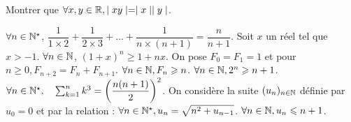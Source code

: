 \begin{exercise}[subtitle= Disjonction des cas]
	\begin{tasks} 
		\task Montrer que $\forall x,y \in \mathbb{R},  \mid xy \mid =\mid x \mid\mid y \mid$.  
	\end{tasks}
\end{exercise}


\begin{exercise}[subtitle= Récurrence]
	\begin{tasks} 
	\task \Mq $\forall n \in \mathbb{N}^\star$, $\dfrac{1}{1\times 2}+\dfrac{1}{2\times 3}+\dots+\dfrac{1}{n\times (n+1)}=\dfrac{n}{n+1}$.
	\task Soit $x$ un réel tel que $x>-1$. \Mq  $\forall n \in \mathbb{N}$, $(1+x)^n\geqslant 1+nx$.
	\task On pose $F_0=F_1= 1$ et pour $n\geqslant 0,F_{n+2}=F_n+F_{n+1}$. \Mq  $ \forall n\in \mathbb{N}, F_n\geqslant n$.
	\task \Mq $\forall n \in \mathbb{N}, 2^n \geqslant n+1$.
	\task \Mq $\forall n\in \mathbb{N}^\star, \quad \sum_{k=1}^n k^3=\left(\dfrac{n(n+1)}{2}\right)^2$.
	\task On considère la suite $(u_n)_{n\in \mathbb{N}}$ définie par $u_0=0$ et par la relation : $\forall n \in \mathbb{N}^\star, u_n=\sqrt{n^2+u_{n-1}}$. \Mq $\forall n \in \mathbb{N}, u_n \leqslant n+ 1$.
	\end{tasks}
\end{exercise}




